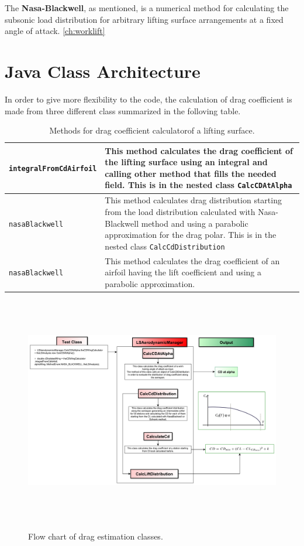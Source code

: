 The {\bfseries Nasa-Blackwell}, as mentioned, is a numerical method for calculating the subsonic load distribution for arbitrary lifting surface arrangements at a fixed angle of attack. \ref{ch:worklift}


\section{Java Class Architecture}


In order to give more flexibility to the code, the calculation of drag coefficient is made from three different class summarized in the folloving table.

\begin{table}[H]
\begin{tabular}{p{7cm}p{7.5cm}}
\toprule
\lstinline[language=Java]!integralFromCdAirfoil! & This method calculates the drag coefficient of the lifting surface using an integral and calling other method that fills the needed field. This is in the nested class \texttt{CalcCDAtAlpha}\\ \hline 
\lstinline[language=Java]!nasaBlackwell! &This method calculates drag distribution starting from the load distribution calculated with Nasa-Blackwell method and using a parabolic approximation for the drag polar.  This is in the nested class \texttt{CalcCdDistribution} \\ \hline 
\lstinline[language=Java]!nasaBlackwell! & This method calculates the drag coefficient of an airfoil having the lift coefficient and using a parabolic approximation.\\ 
\bottomrule
\end{tabular}
\caption{Methods for drag coefficient calculatorof a lifting surface.}
\label{table:Table2}
\end{table}

\begin{figure}[H]
\centering
{\includegraphics[height=9.9cm]{immagini/dragflowchart.pdf}}
\caption{Flow chart of drag estimation classes.}
\label{fig:Drag}
\end{figure}

